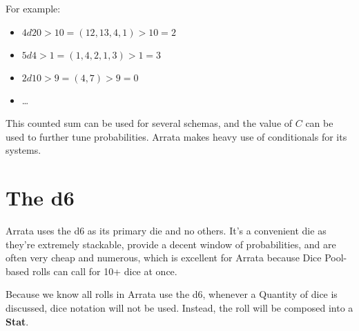 \documentclass[../main.tex]{subfiles}
\begin{document}
    For example:

    \begin{itemize}
        \item $4d20>10 = (12, 13, 4, 1)>10 = 2$
        \item $5d4>1 = (1, 4, 2, 1, 3)>1 = 3$
        \item $2d10>9 = (4, 7)>9 = 0$
        \item \dots
    \end{itemize}

    This counted sum can be used for several schemas, and the value of $C$ can be used to further tune probabilities. Arrata makes heavy use of conditionals for its systems.

    \section{The d6}

    Arrata uses the d6 as its primary die and no others. It's a convenient die as they're extremely stackable, provide a decent window of probabilities, and are often very cheap and numerous, which is excellent for Arrata because Dice Pool-based rolls can call for 10+ dice at once.

    Because we know all rolls in Arrata use the d6, whenever a Quantity of dice is discussed, dice notation will not be used. Instead, the roll will be composed into a \textbf{Stat}.
\end{document}
